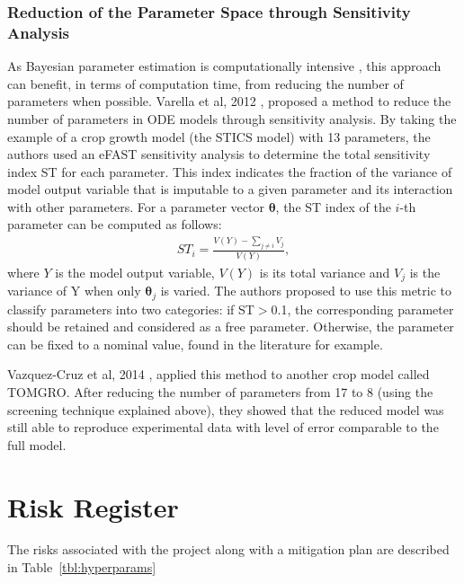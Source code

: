 \documentclass[11pt]{article}
\begin{document}
\subsubsection{Reduction of the Parameter Space through Sensitivity Analysis}
As Bayesian parameter estimation is computationally intensive  \cite{revParamEst}, this approach can benefit, in terms of computation time, from reducing the number of parameters when possible. Varella et al, 2012 \cite{varellaEFAT}, proposed a method to reduce the number of parameters in ODE models through sensitivity analysis. By taking the example of a crop growth model (the STICS model) with 13 parameters, the authors used an eFAST sensitivity analysis to determine the total sensitivity index ST for each parameter. This index indicates the fraction of the variance of model output variable that is imputable to a given parameter and its interaction with other parameters. For a parameter vector $\boldsymbol{\theta}$, the ST index of the $i$-th parameter can be computed as follows:
\begin{align*}
    ST_i =\frac{ V(Y) - \sum_{j \neq i}V_j}{V(Y)},
\end{align*}
where $Y$ is the model output variable, $V(Y)$ is its total variance and $V_j$ is the variance of Y when only $\boldsymbol{\theta}_j$ is varied.
The authors proposed to use this metric to classify parameters into two categories: if ST$>$0.1, the corresponding parameter should be retained and considered as a free parameter. Otherwise, the parameter can be fixed to a nominal value, found in the literature for example. 

Vazquez-Cruz et al, 2014 \cite{tomgro}, applied this method to another crop model called TOMGRO. After reducing the number of parameters from 17 to 8 (using the screening technique explained above), they showed that the reduced model was still able to reproduce experimental data with level of error comparable to the full model.  

\section{Risk Register}
The risks associated with the project along with a mitigation plan are described in Table~\ref{tbl:hyperparams}
\end{document}
